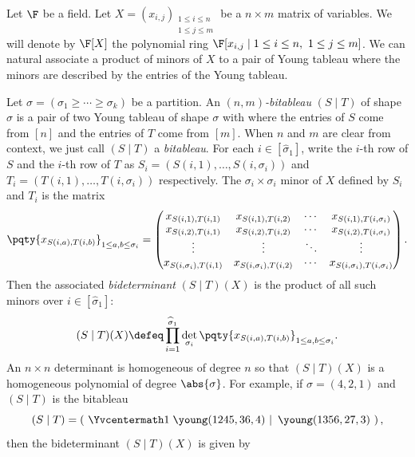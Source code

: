 \documentclass[letterpaper, 11pt]{amsart}
\begin{document}
Let $\F$ be a field.
Let $X = (x_{i, j})_{\substack{1 \leq i \leq n \\ 1 \leq j \leq m}}$ be a $n \times m$ matrix of variables.
We will denote by $\F[X]$ the polynomial ring $\F[x_{i, j} \mid 1 \leq i \leq n,\ 1 \leq j \leq m]$.
We can natural associate a product of minors of $X$ to a pair of Young tableau where the minors are described by the entries of the Young tableau.
\begin{defn}\label{defn:bitableau}
    Let $\sigma = (\sigma_1 \geq \cdots \geq \sigma_k)$ be a partition.
    An \emph{$(n, m)$-bitableau} $(S \mid T)$ of shape $\sigma$ is a pair of two Young tableau of shape $\sigma$ with where the entries of $S$ come from $[n]$ and the entries of $T$ come from $[m]$.
    When $n$ and $m$ are clear from context, we just call $(S \mid T)$ a \emph{bitableau}.
    For each $i\in [\widehat{\sigma}_1]$, write the $i$-th row of $S$ and the $i$-th row of $T$ as $S_i = (S(i, 1), \ldots, S(i, \sigma_i))$ and $T_i = (T(i, 1), \ldots,  T(i, \sigma_i))$ respectively.
    The $\sigma_i \times \sigma_i$ minor of $X$ defined by $S_i$ and $T_i$ is the matrix
    \[
        \pqty{x_{S(i, a), T(i, b)}}_{1 \leq a, b \leq \sigma_i} = 
            \begin{pmatrix}
                x_{S(i, 1), T(i, 1)}        & x_{S(i, 1), T(i, 2)}        & \cdots & x_{S(i, 1), T(i, \sigma_i)} \\
                x_{S(i, 2), T(i, 1)}        & x_{S(i, 2), T(i, 2)}        & \cdots & x_{S(i, 2), T(i, \sigma_i)} \\
                \vdots                      & \vdots                      & \ddots & \vdots \\
                x_{S(i, \sigma_i), T(i, 1)} & x_{S(i, \sigma_i), T(i, 2)} & \cdots & x_{S(i, \sigma_i), T(i, \sigma_i)}
            \end{pmatrix}.
    \]
    Then the associated \emph{bideterminant} $(S \mid T)(X)$ is the product of all such minors over $i\in [\widehat{\sigma}_1]$:
    \[
        (S \mid T)(X) \defeq \prod_{i = 1}^{\widehat{\sigma}_1} \det_{\sigma_i}\pqty{x_{S(i, a), T(i, b)}}_{1 \leq a, b \leq \sigma_i}.
    \]
    An $n \times n$ determinant is homogeneous of degree $n$ so that $(S \mid T)(X)$ is a homogeneous polynomial of degree $\abs{\sigma}$.
    For example, if $\sigma = (4, 2, 1)$ and $(S \mid T)$ is the bitableau
    \[
        (S \mid T) = \left(\ \Yvcentermath1 \left. \young(1245,36,4)\ \right\vert\ \young(1356,27,3) \ \right),
    \]
    then the bideterminant $(S \mid T)(X)$ is given by

\end{defn}
\end{document}
